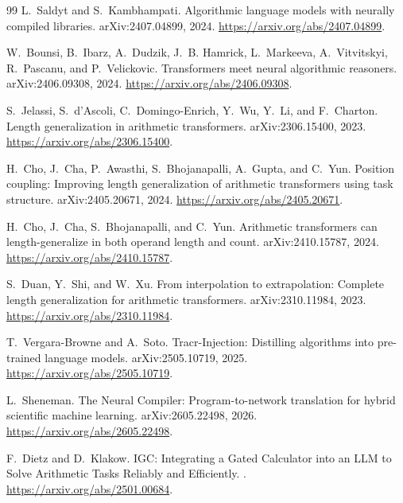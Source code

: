 \documentclass[11pt]{article}
\begin{document}
\begin{thebibliography}{99}
L.~Saldyt and S.~Kambhampati.
\newblock Algorithmic language models with neurally compiled libraries.
\newblock arXiv:2407.04899, 2024.
\newblock \url{https://arxiv.org/abs/2407.04899}.

W.~Bounsi, B.~Ibarz, A.~Dudzik, J.~B. Hamrick, L.~Markeeva, A.~Vitvitskyi,
R.~Pascanu, and P.~Velickovic.
\newblock Transformers meet neural algorithmic reasoners.
\newblock arXiv:2406.09308, 2024.
\newblock \url{https://arxiv.org/abs/2406.09308}.

S.~Jelassi, S.~d'Ascoli, C.~Domingo-Enrich, Y.~Wu, Y.~Li, and F.~Charton.
\newblock Length generalization in arithmetic transformers.
\newblock arXiv:2306.15400, 2023.
\newblock \url{https://arxiv.org/abs/2306.15400}.

H.~Cho, J.~Cha, P.~Awasthi, S.~Bhojanapalli, A.~Gupta, and C.~Yun.
\newblock Position coupling: Improving length generalization of arithmetic
transformers using task structure.
\newblock arXiv:2405.20671, 2024.
\newblock \url{https://arxiv.org/abs/2405.20671}.

H.~Cho, J.~Cha, S.~Bhojanapalli, and C.~Yun.
\newblock Arithmetic transformers can length-generalize in both operand length
and count.
\newblock arXiv:2410.15787, 2024.
\newblock \url{https://arxiv.org/abs/2410.15787}.

S.~Duan, Y.~Shi, and W.~Xu.
\newblock From interpolation to extrapolation: Complete length generalization
for arithmetic transformers.
\newblock arXiv:2310.11984, 2023.
\newblock \url{https://arxiv.org/abs/2310.11984}.

T.~Vergara-Browne and A.~Soto.
\newblock Tracr-Injection: Distilling algorithms into pre-trained language
models.
\newblock arXiv:2505.10719, 2025.
\newblock \url{https://arxiv.org/abs/2505.10719}.

L.~Sheneman.
\newblock The Neural Compiler: Program-to-network translation for hybrid
scientific machine learning.
\newblock arXiv:2605.22498, 2026.
\newblock \url{https://arxiv.org/abs/2605.22498}.

F.~Dietz and D.~Klakow.
\newblock IGC: Integrating a Gated Calculator into an LLM to Solve Arithmetic
Tasks Reliably and Efficiently.
.
\newblock \url{https://arxiv.org/abs/2501.00684}.

\end{thebibliography}
\end{document}
